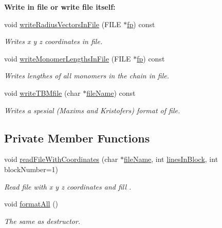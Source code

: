 \begin{Indent}{\bf Write in file or write file itself\+:}\par
\begin{DoxyCompactItemize}
\item 
void \hyperlink{class_p_c_a_1_1_polymer_a9859e587476da47e49cfee1152e93fa0}{write\+Radius\+Vectors\+In\+File} (F\+I\+LE $\ast$\hyperlink{scaling_picture__new_8m_a883a1b899b644be7fc6d704c1d8e0c04}{fp}) const
\begin{DoxyCompactList}\small\item\em Writes x y z coordinates in file. \end{DoxyCompactList}\item 
void \hyperlink{class_p_c_a_1_1_polymer_a081b8e4d7cac0da6cc411c7b56ff7362}{write\+Monomer\+Lengths\+In\+File} (F\+I\+LE $\ast$\hyperlink{scaling_picture__new_8m_a883a1b899b644be7fc6d704c1d8e0c04}{fp}) const
\begin{DoxyCompactList}\small\item\em Writes lengthes of all monomers in the chain in file. \end{DoxyCompactList}\item 
void \hyperlink{class_p_c_a_1_1_polymer_ac89188a3e56684ff3313a43ff83abea0}{write\+T\+B\+Mfile} (char $\ast$\hyperlink{map_end_to_end_movie_8m_acbece2625a541230e9f9091adca38c8c}{file\+Name}) const
\begin{DoxyCompactList}\small\item\em Writes a spesial (Maxim\textquotesingle{}s and Kristofer\textquotesingle{}s) format of file. \end{DoxyCompactList}\end{DoxyCompactItemize}
\end{Indent}
\subsection*{Private Member Functions}
\begin{DoxyCompactItemize}
\item 
void \hyperlink{class_p_c_a_1_1_polymer_a777691bb321ef1da30a064757eb480c7}{read\+File\+With\+Coordinates} (char $\ast$\hyperlink{map_end_to_end_movie_8m_acbece2625a541230e9f9091adca38c8c}{file\+Name}, int \hyperlink{scaling_picture__new_8m_a99716bc9e3670ef8bdae76de0e833de2}{lines\+In\+Block}, int block\+Number=1)
\begin{DoxyCompactList}\small\item\em Read file with x y z coordinates and fill . \end{DoxyCompactList}\item 
void \hyperlink{class_p_c_a_1_1_polymer_a3fcca4084a54ac8bc1941b36462bc560}{format\+All} ()
\begin{DoxyCompactList}\small\item\em The same as destructor. \end{DoxyCompactList}\end{DoxyCompactItemize}
